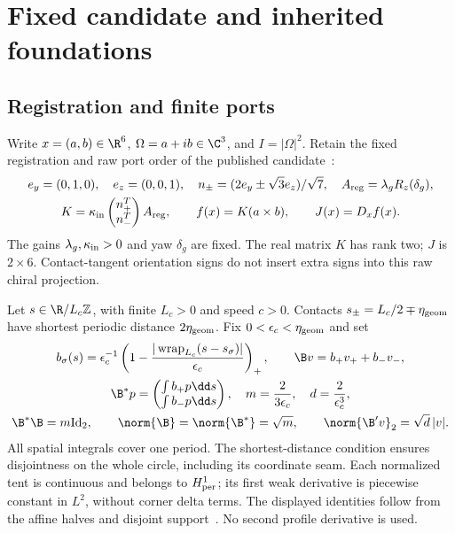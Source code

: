 \section{Fixed candidate and inherited foundations}\label{sec:model}
\subsection{Registration and finite ports}
Write $x=(a,b)\in\R^6$, $\Omega=a+ib\in\C^3$, and $I=|\Omega|^2$. Retain the fixed registration and raw port order of the published candidate~\cite[Section 1]{p1}:
\begin{equation}\label{eq:registration}%
\begin{gathered}
e_y=(0,1,0),\quad e_z=(0,0,1),\quad
n_\pm=(2e_y\pm\sqrt3e_z)/\sqrt7,\quad A_{\rm reg}=\lambda_gR_z(\delta_g),\\
K=\kappa_{\rm in}\begin{pmatrix}n_+^T\\ n_-^T\end{pmatrix}A_{\rm reg},
\qquad f(x)=K(a\times b),\qquad J(x)=D_xf(x).
\end{gathered}
\end{equation}
The gains $\lambda_g,\kappa_{\rm in}>0$ and yaw $\delta_g$ are fixed. The real matrix $K$ has rank two; $J$ is $2\times6$. Contact-tangent orientation signs do not insert extra signs into this raw chiral projection.

Let $s\in\R/L_c\mathbb Z$, with finite $L_c>0$ and speed $c>0$. Contacts $s_\pm=L_c/2\mp\eta_{\rm geom}$ have shortest periodic distance $2\eta_{\rm geom}$. Fix $0<\epsilon_c<\eta_{\rm geom}$ and set
\begin{equation}\label{eq:ports}%
\begin{gathered}
b_\sigma(s)=\epsilon_c^{-1}
\left(1-\frac{|\operatorname{wrap}_{L_c}(s-s_\sigma)|}{\epsilon_c}\right)_+,\qquad
\B v=b_+v_++b_-v_-,\\
\B^*p=\begin{pmatrix}\int b_+p\dd s\\ \int b_-p\dd s\end{pmatrix},\quad
m=\frac2{3\epsilon_c},\quad d=\frac2{\epsilon_c^3},\\
\B^*\B=m\mathrm{Id}_2,\qquad
\norm{\B}=\norm{\B^*}=\sqrt m,\qquad \norm{\B'v}_2=\sqrt d\,|v|.
\end{gathered}
\end{equation}
All spatial integrals cover one period. The shortest-distance condition ensures disjointness on the whole circle, including its coordinate seam. Each normalized tent is continuous and belongs to $H^1_{\rm per}$; its first weak derivative is piecewise constant in $L^2$, without corner delta terms. The displayed identities follow from the affine halves and disjoint support~\cite[Section 3]{p1}. No second profile derivative is used.

